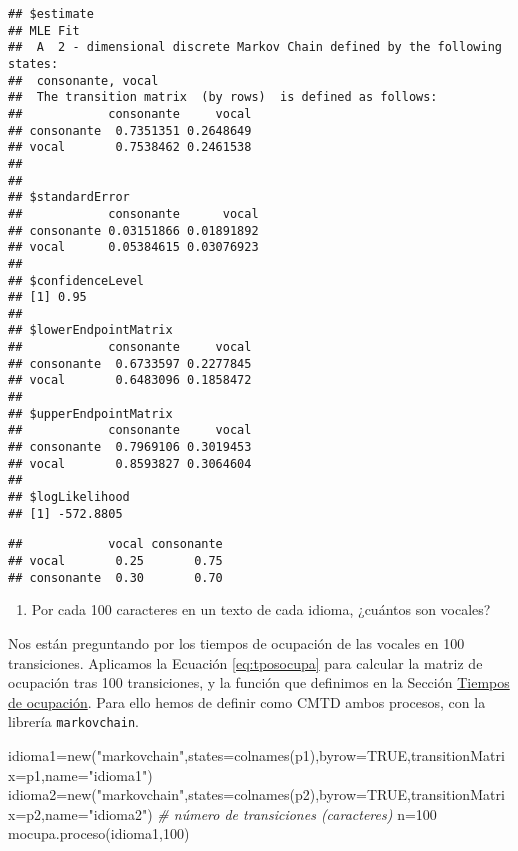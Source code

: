 \documentclass[
]{book}
\newenvironment{Shaded}{\begin{snugshade}}{\end{snugshade}}
\newcommand{\AttributeTok}[1]{\textcolor[rgb]{0.77,0.63,0.00}{#1}}
\newcommand{\CommentTok}[1]{\textcolor[rgb]{0.56,0.35,0.01}{\textit{#1}}}
\newcommand{\ConstantTok}[1]{\textcolor[rgb]{0.00,0.00,0.00}{#1}}
\newcommand{\DecValTok}[1]{\textcolor[rgb]{0.00,0.00,0.81}{#1}}
\newcommand{\FunctionTok}[1]{\textcolor[rgb]{0.00,0.00,0.00}{#1}}
\newcommand{\NormalTok}[1]{#1}
\newcommand{\OtherTok}[1]{\textcolor[rgb]{0.56,0.35,0.01}{#1}}
\newcommand{\StringTok}[1]{\textcolor[rgb]{0.31,0.60,0.02}{#1}}
\providecommand{\tightlist}{%
  \setlength{\itemsep}{0pt}\setlength{\parskip}{0pt}}
\theoremstyle{definition}
\theoremstyle{definition}
\theoremstyle{definition}
\theoremstyle{definition}
\theoremstyle{remark}
\begin{document}
\begin{verbatim}
## $estimate
## MLE Fit 
##  A  2 - dimensional discrete Markov Chain defined by the following states: 
##  consonante, vocal 
##  The transition matrix  (by rows)  is defined as follows: 
##            consonante     vocal
## consonante  0.7351351 0.2648649
## vocal       0.7538462 0.2461538
## 
## 
## $standardError
##            consonante      vocal
## consonante 0.03151866 0.01891892
## vocal      0.05384615 0.03076923
## 
## $confidenceLevel
## [1] 0.95
## 
## $lowerEndpointMatrix
##            consonante     vocal
## consonante  0.6733597 0.2277845
## vocal       0.6483096 0.1858472
## 
## $upperEndpointMatrix
##            consonante     vocal
## consonante  0.7969106 0.3019453
## vocal       0.8593827 0.3064604
## 
## $logLikelihood
## [1] -572.8805
\end{verbatim}

\begin{verbatim}
##            vocal consonante
## vocal       0.25       0.75
## consonante  0.30       0.70
\end{verbatim}

\begin{enumerate}
\def\labelenumi{\arabic{enumi}.}
\tightlist
\item
  Por cada 100 caracteres en un texto de cada idioma, ¿cuántos son vocales?
\end{enumerate}

Nos están preguntando por los tiempos de ocupación de las vocales en 100 transiciones. Aplicamos la Ecuación \eqref{eq:tposocupa} para calcular la matriz de ocupación tras 100 transiciones, y la función que definimos en la Sección \href{tiemposocupa-sec}{Tiempos de ocupación}. Para ello hemos de definir como CMTD ambos procesos, con la librería \texttt{markovchain}.

\begin{Shaded}
\begin{Highlighting}[]
\NormalTok{idioma1}\OtherTok{=}\FunctionTok{new}\NormalTok{(}\StringTok{"markovchain"}\NormalTok{,}\AttributeTok{states=}\FunctionTok{colnames}\NormalTok{(p1),}\AttributeTok{byrow=}\ConstantTok{TRUE}\NormalTok{,}\AttributeTok{transitionMatrix=}\NormalTok{p1,}\AttributeTok{name=}\StringTok{"idioma1"}\NormalTok{)}
\NormalTok{idioma2}\OtherTok{=}\FunctionTok{new}\NormalTok{(}\StringTok{"markovchain"}\NormalTok{,}\AttributeTok{states=}\FunctionTok{colnames}\NormalTok{(p2),}\AttributeTok{byrow=}\ConstantTok{TRUE}\NormalTok{,}\AttributeTok{transitionMatrix=}\NormalTok{p2,}\AttributeTok{name=}\StringTok{"idioma2"}\NormalTok{)}
\CommentTok{\# número de transiciones (caracteres)}
\NormalTok{n}\OtherTok{=}\DecValTok{100}
\FunctionTok{mocupa.proceso}\NormalTok{(idioma1,}\DecValTok{100}\NormalTok{)}
\end{Highlighting}
\end{Shaded}
\end{document}
